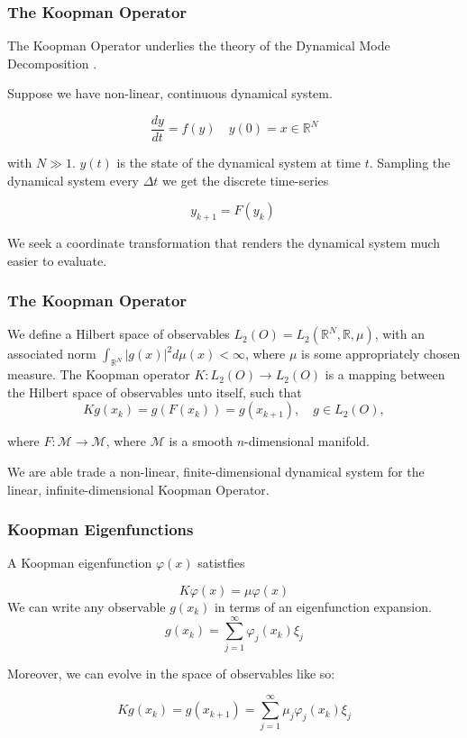 \documentclass{beamer}
\begin{document}
\begin{frame}
    \frametitle{The Koopman Operator}
    The Koopman Operator underlies the theory of the Dynamical Mode Decomposition \cite{brunton2021modern}.

\vspace{3mm}

Suppose we have non-linear, continuous dynamical system.

    $$
\frac{dy}{dt} = f(y) \quad y(0) = x \in \mathbb{R}^N
$$

\noindent with $N\gg1$. $y(t)$ is the state of the dynamical system at time $t$. Sampling the dynamical
system every $\Delta t$ we get the discrete time-series

$$
y_{k+1} = F(y_k)\
$$

We seek a coordinate transformation that renders the dynamical system much easier to evaluate.

\end{frame}

\begin{frame}
\frametitle{The Koopman Operator}
\begin{definition}
    We define a Hilbert space of observables $ L_2(O) = L_2(\mathbb{R}^N, \mathbb{R}, \mu)$, with an associated norm 
    $\int_{\mathbb{R}^N} |g(x) |^2 d\mu(x)  < \infty$, where $\mu$ is some appropriately chosen measure. The Koopman
    operator $K : L_2(O) \rightarrow L_2(O)$ is a mapping between the Hilbert space of observables unto itself, such that
    $$
    Kg(x_k) = g(F(x_k)) = g(x_{k+1}), \quad g \in L_2(O),
    $$

    \noindent where $F:\mathcal{M}\rightarrow \mathcal{M}$, where $\mathcal{M}$ is a smooth $n$-dimensional manifold.
\end{definition}

We are able trade a non-linear, finite-dimensional dynamical system for the linear, infinite-dimensional Koopman Operator.

\end{frame}

\begin{frame}
    \frametitle{Koopman Eigenfunctions}
    A Koopman eigenfunction $\varphi(x)$ satistfies

    $$
        K\varphi(x) = \mu \varphi(x)
    $$
    We can write any observable $g(x_k)$ in terms of an eigenfunction expansion.
    $$
    g(x_k) = \sum^{\infty}_{j=1} \varphi_{j}(x_k) \xi_{j}
    $$

    Moreover, we can evolve in the space of observables like so:

    $$
    Kg(x_k) = g(x_{k+1}) =  \sum^{\infty}_{j=1} \mu_j \varphi_{j}(x_k) \xi_{j}
    $$
\end{frame}
\end{document}

